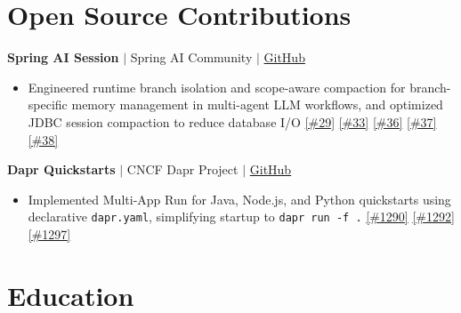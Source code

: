 \documentclass[letterpaper,10pt]{article}
\begin{document}
\vspace{-4pt}


\section{Open Source Contributions}

\textbf{Spring AI Session} $|$ Spring AI Community $|$
\href{https://github.com/spring-ai-community/spring-ai-session}{GitHub}

\begin{itemize}[leftmargin=*, itemsep=0pt, topsep=1pt]
\item Engineered runtime branch isolation and scope-aware compaction for branch-specific memory management in multi-agent LLM workflows, and optimized JDBC session compaction to reduce database I/O
\href{https://github.com/spring-ai-community/spring-ai-session/pull/29}{[\#29]}
\href{https://github.com/spring-ai-community/spring-ai-session/pull/33}{[\#33]}
\href{https://github.com/spring-ai-community/spring-ai-session/pull/36}{[\#36]}
\href{https://github.com/spring-ai-community/spring-ai-session/pull/37}{[\#37]}
\href{https://github.com/spring-ai-community/spring-ai-session/pull/38}{[\#38]}
\end{itemize}

\vspace{-4pt}

\textbf{Dapr Quickstarts} $|$ CNCF Dapr Project $|$
\href{https://github.com/dapr/quickstarts}{GitHub}

\begin{itemize}[leftmargin=*, itemsep=0pt, topsep=1pt]
\item Implemented Multi-App Run for Java, Node.js, and Python quickstarts using declarative \texttt{dapr.yaml}, simplifying startup to \texttt{dapr run -f .}
\href{https://github.com/dapr/quickstarts/pull/1290}{[\#1290]}
\href{https://github.com/dapr/quickstarts/pull/1292}{[\#1292]}
\href{https://github.com/dapr/quickstarts/pull/1297}{[\#1297]}
\end{itemize}

\vspace{-4pt}


\section{Education}
\end{document}
